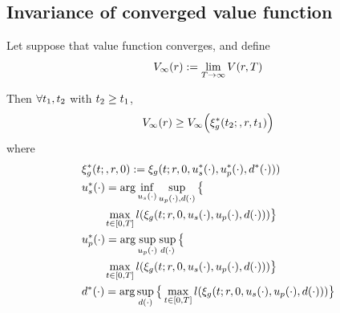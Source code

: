 \subsection{Invariance of converged value function}
 \begin{prop}
   \label{prop:main}
   Let suppose that value function converges, and define
      \begin{equation}
      \label{eq:conv_valfunc}
      V_\infty(r) := \lim_{T\rightarrow\infty}V(r, T)
      \end{equation}
 
   Then $\forall t_1, t_2$ with $t_2 \ge t_1$,
   \begin{equation}
   \label{eq:invariant}
   V_\infty(r) \ge V_\infty\Big(\xi_g^*(t_2;, r, t_1)\Big)
   \end{equation}
   \noindent where
   \begin{equation}
   \begin{aligned}
   & \xi_g^*(t;, r, 0) := \xi_g(t; r, 0, u_s^*(\cdot), u_p^*(\cdot), d^*(\cdot))) \\
   & u_s^*(\cdot) = \arg \inf_{u_s(\cdot)} \sup_{u_p(\cdot), d(\cdot)}\big\{ \\
   & \qquad \max_{t \in [0, T]} l(\xi_g(t; r, 0, u_s(\cdot), u_p(\cdot), d(\cdot))) \big\}\\
   & u_p^*(\cdot) = \arg \sup_{u_p(\cdot)} \sup_{d(\cdot)} \big\{ \\
   & \qquad \max_{t \in [0, T]} l(\xi_g(t; r, 0, u_s(\cdot), u_p(\cdot), d(\cdot))) \big\} \\
   & d^*(\cdot) = \arg \sup_{d(\cdot)} \big\{\max_{t \in [0, T]} l(\xi_g(t; r, 0, u_s(\cdot), u_p(\cdot),  d(\cdot))) \big\}
   \end{aligned}
   \end{equation}
 \end{prop}

